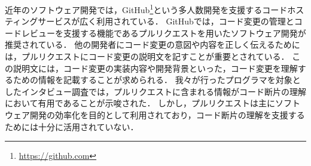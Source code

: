
近年のソフトウェア開発では，GitHub\footnote{\url{https://github.com}}という多人数開発を支援するコードホスティングサービスが広く利用されている．
GitHubでは，コード変更の管理とコードレビューを支援する機能であるプルリクエストを用いたソフトウェア開発が推奨されている．
他の開発者にコード変更の意図や内容を正しく伝えるためには，プルリクエストにコード変更の説明文を記すことが重要とされている．
この説明文には，コード変更の実装内容や開発背景といった，コード変更を理解するための情報を記載することが求められる．
我々が行ったプログラマを対象としたインタビュー調査では，プルリクエストに含まれる情報がコード断片の理解において有用であることが示唆された．
しかし，プルリクエストは主にソフトウェア開発の効率化を目的として利用されており，コード断片の理解を支援するためには十分に活用されていない．





